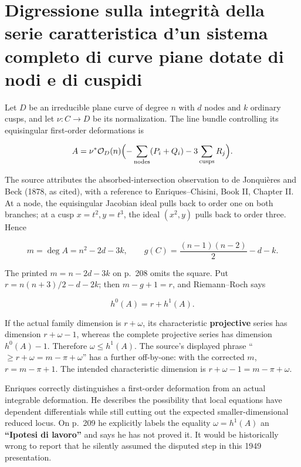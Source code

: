 \section[La serie caratteristica delle curve piane]{Digressione sulla integrit\`a della serie caratteristica d'un sistema completo di curve piane dotate di nodi e di cuspidi}
\label{cp1-v-12}

Let \(D\) be an irreducible plane curve of degree \(n\) with \(d\) nodes and \(k\) ordinary cusps, and let \(\nu:C\to D\) be its normalization. The line bundle controlling its equisingular first-order deformations is

\[
A=\nu^*\mathcal O_D(n)
 \Bigl(-\sum_{\rm nodes}(P_i+Q_i)-3\sum_{\rm cusps}R_j\Bigr).
\]

The source attributes the absorbed-intersection observation to de Jonquières and Beck (1878, as cited), with a reference to Enriques--Chisini, Book II, Chapter II. At a node, the equisingular Jacobian ideal pulls back to order one on both branches; at a cusp \(x=t^2,y=t^3\), the ideal \((x^2,y)\) pulls back to order three. Hence

\[
m=\deg A=n^2-2d-3k,\qquad
g(C)=\frac{(n-1)(n-2)}2-d-k.
\]

The printed \(m=n-2d-3k\) on p.~208 omits the square. Put \(r=n(n+3)/2-d-2k\); then \(m-g+1=r\), and Riemann--Roch says

\[
h^0(A)=r+h^1(A).
\]

If the actual family dimension is \(r+\omega\), its characteristic \textbf{projective} series has dimension \(r+\omega-1\), whereas the complete projective series has dimension \(h^0(A)-1\). Therefore \(\omega\le h^1(A)\). The source's displayed phrase ``\(\ge r+\omega=m-\pi+\omega\)'' has a further off-by-one: with the corrected \(m\), \(r=m-\pi+1\). The intended characteristic dimension is \(r+\omega-1=m-\pi+\omega\).

Enriques correctly distinguishes a first-order deformation from an actual integrable deformation. He describes the possibility that local equations have dependent differentials while still cutting out the expected smaller-dimensional reduced locus. On p.~209 he explicitly labels the equality \(\omega=h^1(A)\) an \textbf{``Ipotesi di lavoro''} and says he has not proved it. It would be historically wrong to report that he silently assumed the disputed step in this 1949 presentation.

